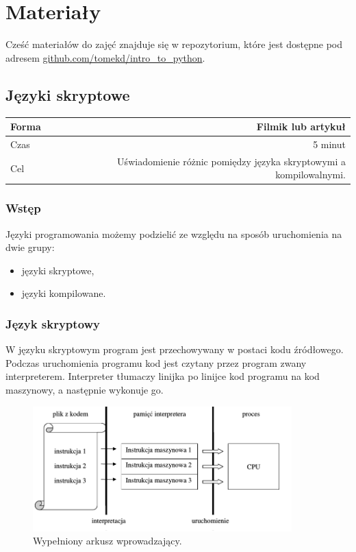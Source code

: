 \documentclass{mwart}
\begin{document}
\section{Materiały}
Cześć materiałów do zajęć znajduje się w repozytorium, które jest dostępne pod adresem
\url{github.com/tomekd/intro_to_python}.

\subsection{Języki skryptowe}
\begin{center}
  \begin{tabular}{lr}
    \toprule
    Forma & Filmik lub artykuł \\
    \midrule
    Czas & 5 minut \\
    Cel & Uświadomienie różnic pomiędzy języka skryptowymi a kompilowalnymi. \\
    \bottomrule
  \end{tabular}
\end{center}

\subsubsection{Wstęp}
Języki programowania możemy podzielić ze względu na sposób uruchomienia na dwie grupy:

\begin{itemize}
  \item języki skryptowe,
  \item języki kompilowane.
\end{itemize}

\subsubsection{Język skryptowy}
W języku skryptowym program jest przechowywany w postaci kodu źródłowego. Podczas
uruchomienia programu kod jest czytany przez program zwany interpreterem. Interpreter
tłumaczy linijka po linijce kod programu na kod maszynowy, a następnie wykonuje go.

\begin{center}
  \begin{figure}
    \includegraphics[width=10cm]{diag1}
    \caption{Wypełniony arkusz wprowadzający.}
  \end{figure}
\end{center}
\end{document}
